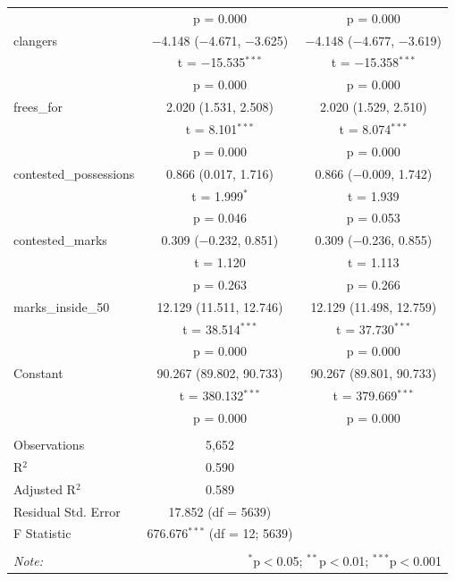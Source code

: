 \documentclass{article}
\begin{document}
\begin{table}[!htbp]
\begin{tabular}{@{\extracolsep{5pt}}lcc}
  & p = 0.000 & p = 0.000 \\ 
  clangers & $-$4.148 ($-$4.671, $-$3.625) & $-$4.148 ($-$4.677, $-$3.619) \\ 
  & t = $-$15.535$^{***}$ & t = $-$15.358$^{***}$ \\ 
  & p = 0.000 & p = 0.000 \\ 
  frees\_for & 2.020 (1.531, 2.508) & 2.020 (1.529, 2.510) \\ 
  & t = 8.101$^{***}$ & t = 8.074$^{***}$ \\ 
  & p = 0.000 & p = 0.000 \\ 
  contested\_possessions & 0.866 (0.017, 1.716) & 0.866 ($-$0.009, 1.742) \\ 
  & t = 1.999$^{*}$ & t = 1.939 \\ 
  & p = 0.046 & p = 0.053 \\ 
  contested\_marks & 0.309 ($-$0.232, 0.851) & 0.309 ($-$0.236, 0.855) \\ 
  & t = 1.120 & t = 1.113 \\ 
  & p = 0.263 & p = 0.266 \\ 
  marks\_inside\_50 & 12.129 (11.511, 12.746) & 12.129 (11.498, 12.759) \\ 
  & t = 38.514$^{***}$ & t = 37.730$^{***}$ \\ 
  & p = 0.000 & p = 0.000 \\ 
  Constant & 90.267 (89.802, 90.733) & 90.267 (89.801, 90.733) \\ 
  & t = 380.132$^{***}$ & t = 379.669$^{***}$ \\ 
  & p = 0.000 & p = 0.000 \\ 
 \hline \\[-1.8ex] 
Observations & 5,652 &  \\ 
R$^{2}$ & 0.590 &  \\ 
Adjusted R$^{2}$ & 0.589 &  \\ 
Residual Std. Error & 17.852 (df = 5639) &  \\ 
F Statistic & 676.676$^{***}$ (df = 12; 5639) &  \\ 
\hline 
\hline \\[-1.8ex] 
\textit{Note:}  & \multicolumn{2}{r}{$^{*}$p$<$0.05; $^{**}$p$<$0.01; $^{***}$p$<$0.001} \\ 
\end{tabular} 
\end{table}
\end{document}
